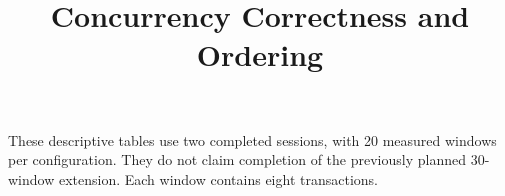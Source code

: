 \documentclass[conference]{IEEEtran}
\begin{document}
\title{Concurrency Correctness and Ordering}
\author{}
\maketitle
\noindent These descriptive tables use two completed sessions, with 20 measured windows per configuration. They do not claim completion of the previously planned 30-window extension. Each window contains eight transactions.


\clearpage
\end{document}
